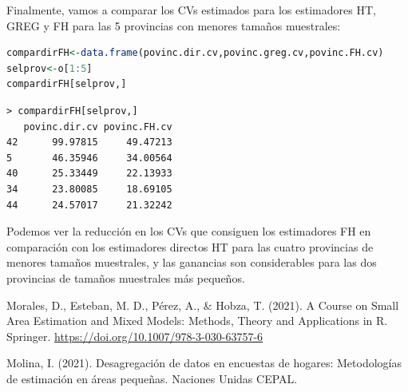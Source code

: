 \documentclass[12pt,spanish]{article}
\begin{document}
Finalmente, vamos a comparar los CVs estimados para los estimadores HT, GREG y FH para las 5 
provincias con menores tamaños muestrales: 

\begin{lstlisting}[language=R]
compardirFH<-data.frame(povinc.dir.cv,povinc.greg.cv,povinc.FH.cv) 
selprov<-o[1:5] 
compardirFH[selprov,]    
\end{lstlisting}

\begin{lstlisting}
> compardirFH[selprov,]
   povinc.dir.cv povinc.FH.cv
42      99.97815     49.47213
5       46.35946     34.00564
40      25.33449     22.13933
34      23.80085     18.69105
44      24.57017     21.32242
\end{lstlisting}

Podemos ver la reducción en los CVs que consiguen los estimadores FH en comparación con los estimadores directos HT para las cuatro provincias de menores tamaños muestrales, y las ganancias son considerables para las dos provincias de tamaños muestrales más pequeños. 





\begin{thebibliography}{3}

Morales, D., Esteban, M. D., Pérez, A., \& Hobza, T. (2021). A Course on Small Area Estimation and Mixed Models: Methods, Theory and Applications in R. Springer. \url{https://doi.org/10.1007/978-3-030-63757-6} 

Molina, I. (2021). Desagregación de datos en encuestas de hogares: Metodologías de estimación en áreas pequeñas. Naciones Unidas CEPAL.



\end{thebibliography}
\end{document}

